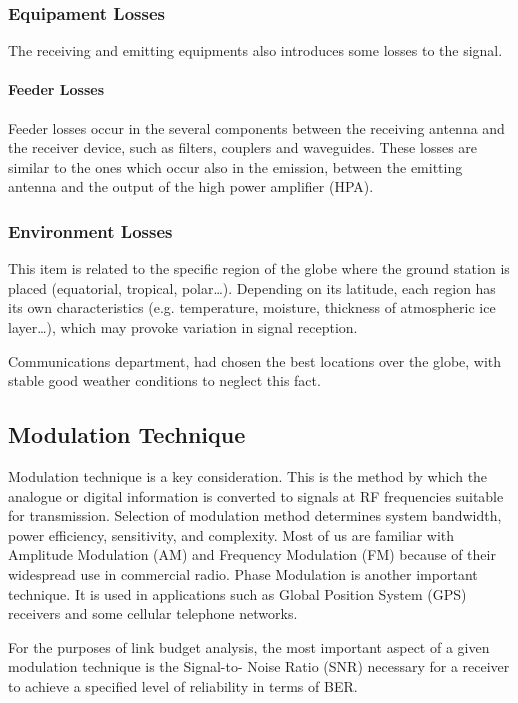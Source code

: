 \subsubsection{Equipament Losses}
The receiving and emitting equipments also introduces some losses to the signal.\\

\paragraph{Feeder Losses} Feeder losses occur in the several components between the receiving antenna and the receiver device, such as filters, couplers and waveguides. These losses are similar to the ones which occur also in the emission, between the emitting antenna and the output of the high power amplifier (HPA).\cite{Jorge2012}

\subsubsection{Environment Losses}
This item is related to the specific region of the globe where the ground station is placed (equatorial, tropical, polar…). Depending on its latitude, each region has its own characteristics (e.g. temperature, moisture, thickness of atmospheric ice layer…), which may provoke variation in signal reception. \cite{Jorge2012}

Communications department, had chosen the best locations over the globe, with stable good weather conditions to neglect this fact.

\subsection{Modulation Technique}
Modulation technique is a key consideration. This is the method by which the analogue or digital information is converted to signals at RF frequencies suitable for transmission. Selection of modulation method determines system bandwidth, power efficiency, sensitivity, and complexity. Most of us are familiar with Amplitude Modulation (AM) and Frequency Modulation (FM) because of their widespread use in commercial radio. Phase Modulation is another important technique. It is used in applications such as Global Position System (GPS) receivers and some cellular telephone networks. \cite{Note1998}

For the purposes of link budget analysis, the most important aspect of a given modulation technique is the Signal-to- Noise Ratio (SNR) necessary for a receiver to achieve a specified level of reliability in terms of BER.

